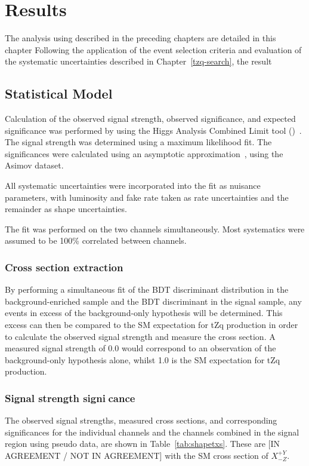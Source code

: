 \chapter{Results}\label{chapter:results}
The analysis using described in the preceding chapters are detailed in this chapter
Following the application of the event selection criteria and evaluation of the systematic uncertainties described in Chapter~\ref{tzq-search}, the result 

\section{Statistical Model}
Calculation of the observed signal strength, observed significance, and
expected significance was performed by using the Higgs Analysis Combined Limit
tool (\combine{})~\cite{Combine}. The signal strength was determined using a
maximum likelihood fit.  The significances were calculated using an asymptotic
approximation~\cite{AsymptoticFormulae}, using the Asimov dataset.

All systematic uncertainties were incorporated into the fit as nuisance
parameters, with luminosity and fake rate taken as rate uncertainties and the
remainder as shape uncertainties.
 
The fit was performed on the two channels simultaneously. Most systematics were
assumed to be 100\% correlated between channels.

\subsection{Cross section extraction}
 
By performing a simultaneous fit of the BDT discriminant distribution in the
background-enriched sample and the BDT discriminant in the signal sample, any
events in excess of the background-only hypothesis will be determined. This
excess can then be compared to the SM expectation for tZq production in order
to calculate the observed signal strength and measure the cross section. A
measured signal strength of 0.0 would correspond to an observation of the
background-only hypothesis alone, whilst 1.0 is the SM expectation for tZq
production.

\subsection{Signal strength signicance}

The observed signal strengths, measured cross sections, and corresponding
significances for the individual channels and the channels combined in the
signal region using pseudo data, are shown in Table~\ref{tab:shapetxs}. These
are [IN AGREEMENT / NOT IN AGREEMENT] with the SM cross section of
$X^{+Y}_{-Z}$.
 
